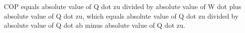 COP equals absolute value of Q dot zu divided by absolute value of W dot plus absolute value of Q dot zu, which equals absolute value of Q dot zu divided by absolute value of Q dot ab minus absolute value of Q dot zu.